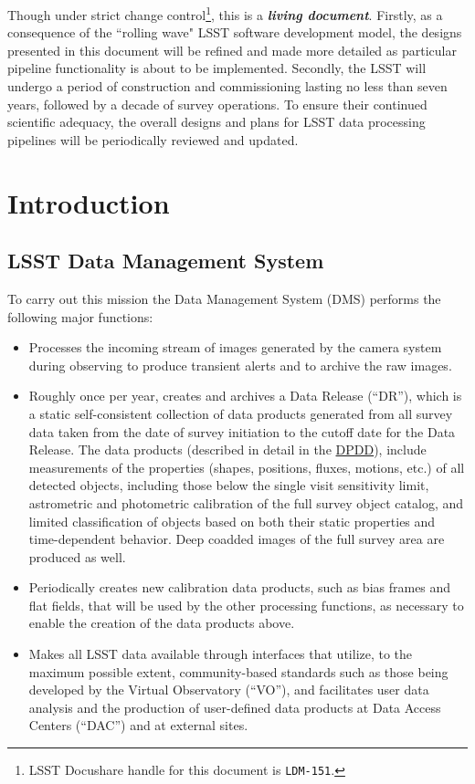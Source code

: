 \documentclass[12pt]{article}
\newcommand{\ds}[2]{{\color{blue} \href{https://docushare.lsstcorp.org/docushare/dsweb/Get/#1}{#2}}\xspace}
\newcommand{\DPDD}{\ds{LSE-163}{DPDD}}
\begin{document}
Though under strict change control\footnote{LSST Docushare handle for this document is {\tt LDM-151}.}, this is a {\bf \em living document}. Firstly, as a consequence of the ``rolling wave" LSST software development model, the designs presented in this document will be refined and made more detailed as particular pipeline functionality is about to be implemented. Secondly, the LSST will undergo a period of construction and commissioning lasting no less than seven years, followed by a decade of survey operations. To ensure their continued scientific adequacy, the overall designs and plans for LSST data processing pipelines will be periodically reviewed and updated.

\clearpage

\section{Introduction}

\subsection{LSST Data Management System}

To carry out this mission the Data Management System (DMS) performs the following major functions:

\begin{itemize}
\item Processes the incoming stream of images generated by the camera
  system during observing to produce transient alerts and to archive
  the raw images.

\item Roughly once per year, creates and archives a Data Release (``DR''),
  which is a static self-consistent collection of data products
  generated from all survey data taken from the date of survey
  initiation to the cutoff date for the Data Release. The data
  products (described in detail in the \DPDD), include measurements of 
  the properties (shapes, positions, fluxes, motions, etc.) of all detected
  objects, including those below the single visit sensitivity limit,
  astrometric and photometric calibration of the full survey object
  catalog, and limited classification of objects based on both their
  static properties and time-dependent behavior.  Deep coadded images
  of the full survey area are produced as well.

\item Periodically creates new calibration data products, such as bias
  frames and flat fields, that will be used by the other processing
  functions, as necessary to enable the creation of the data products above.

\item Makes all LSST data available through interfaces that utilize,
  to the maximum possible extent, community-based standards such as those
  being developed by the Virtual Observatory (``VO''), and facilitates user
  data analysis and the production of user-defined data products at Data
  Access Centers (``DAC'') and at external sites.
\end{itemize}
\end{document}
